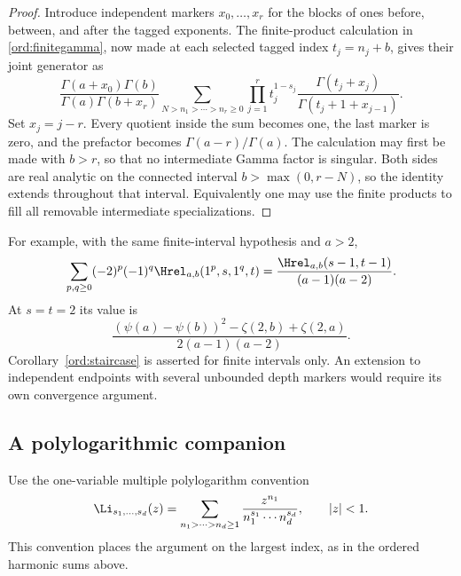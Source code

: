 \begin{proof}
Introduce independent markers $x_0,\ldots,x_r$ for the blocks of ones
before, between, and after the tagged exponents.  The finite-product
calculation in \eqref{ord:finitegamma}, now made at each selected
tagged index $t_j=n_j+b$, gives their joint generator as
\[
 \frac{\Gamma(a+x_0)\Gamma(b)}
      {\Gamma(a)\Gamma(b+x_r)}
 \sum_{N>n_1>\cdots>n_r\ge0}
       \prod_{j=1}^r
           t_j^{1-s_j}
           \frac{\Gamma(t_j+x_j)}
                {\Gamma(t_j+1+x_{j-1})}.
\]
Set $x_j=j-r$.  Every quotient inside the sum becomes one, the last
marker is zero, and the prefactor becomes $\Gamma(a-r)/\Gamma(a)$.
The calculation may first be made with $b>r$, so that no intermediate
Gamma factor is singular.  Both sides are real analytic on the
connected interval $b>\max(0,r-N)$, so the identity extends throughout
that interval.  Equivalently one may use the finite products to fill
all removable intermediate specializations.
\end{proof}

For example, with the same finite-interval hypothesis and $a>2$,
\[
 \sum_{p,q\ge0}(-2)^p(-1)^q
          \Hrel_{a,b}(1^p,s,1^q,t)
       =\frac{\Hrel_{a,b}(s-1,t-1)}{(a-1)(a-2)}.
\]
At $s=t=2$ its value is
\[
 \frac{(\psi(a)-\psi(b))^2-\zeta(2,b)+\zeta(2,a)}
           {2(a-1)(a-2)}.
\]
Corollary~\ref{ord:staircase} is asserted for finite intervals only.
An extension to independent endpoints with several unbounded depth
markers would require its own convergence argument.

\subsection{A polylogarithmic companion}

Use the one-variable multiple polylogarithm convention
\[
 \Li_{s_1,\ldots,s_d}(z)
    =\sum_{n_1>\cdots>n_d\ge1}
        \frac{z^{n_1}}{n_1^{s_1}\cdots n_d^{s_d}},
 \qquad |z|<1.
\]
This convention places the argument on the largest index, as in the
ordered harmonic sums above.

